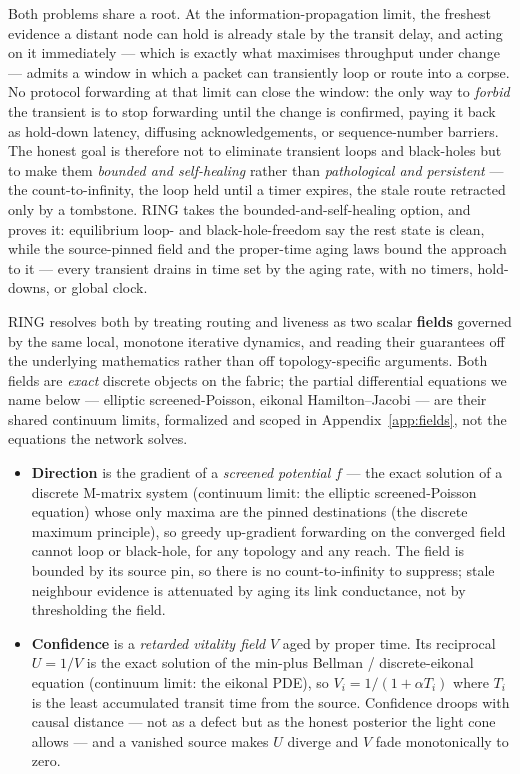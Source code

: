 \documentclass[11pt]{article}
\theoremstyle{plain}
\numberwithin{equation}{section}
\begin{document}
Both problems share a root. At the information-propagation limit, the freshest evidence a distant node can hold is already stale by the transit delay, and acting on it immediately — which is exactly what maximises throughput under change — admits a window in which a packet can transiently loop or route into a corpse. No protocol forwarding at that limit can close the window: the only way to \emph{forbid} the transient is to stop forwarding until the change is confirmed, paying it back as hold-down latency, diffusing acknowledgements, or sequence-number barriers. The honest goal is therefore not to eliminate transient loops and black-holes but to make them \emph{bounded and self-healing} rather than \emph{pathological and persistent} — the count-to-infinity, the loop held until a timer expires, the stale route retracted only by a tombstone. RING takes the bounded-and-self-healing option, and proves it: equilibrium loop- and black-hole-freedom say the rest state is clean, while the source-pinned field and the proper-time aging laws bound the approach to it — every transient drains in time set by the aging rate, with no timers, hold-downs, or global clock.

RING resolves both by treating routing and liveness as two scalar \textbf{fields} governed by the same local, monotone iterative dynamics, and reading their guarantees off the underlying mathematics rather than off topology-specific arguments. Both fields are \emph{exact} discrete objects on the fabric; the partial differential equations we name below — elliptic screened-Poisson, eikonal Hamilton–Jacobi — are their shared continuum limits, formalized and scoped in Appendix~\ref{app:fields}, not the equations the network solves.

\begin{itemize}
\item \textbf{Direction} is the gradient of a \emph{screened potential} $f$ — the exact solution of a discrete M-matrix system (continuum limit: the elliptic screened-Poisson equation) whose only maxima are the pinned destinations (the discrete maximum principle), so greedy up-gradient forwarding on the converged field cannot loop or black-hole, for any topology and any reach. The field is bounded by its source pin, so there is no count-to-infinity to suppress; stale neighbour evidence is attenuated by aging its link conductance, not by thresholding the field.
\item \textbf{Confidence} is a \emph{retarded vitality field} $V$ aged by proper time. Its reciprocal $U=1/V$ is the exact solution of the min-plus Bellman / discrete-eikonal equation (continuum limit: the eikonal PDE), so $V_i=1/(1+\alpha T_i)$ where $T_i$ is the least accumulated transit time from the source. Confidence droops with causal distance — not as a defect but as the honest posterior the light cone allows — and a vanished source makes $U$ diverge and $V$ fade monotonically to zero.
\end{itemize}
\end{document}
